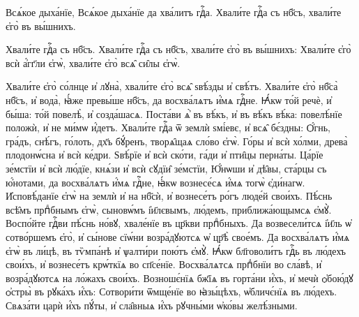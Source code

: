 %
 Всѧ́кое дыха́нїе,  
%
Всѧ́кое дыха́нїе да хва́литъ гдⷭ҇а. \hKv Хвали́те гдⷭ҇а съ нб҃съ,  хвали́те є҆го̀ въ вы́шнихъ. 
\label{vsakoe} 


\cuLettrine
Хвали́те гдⷭ҇а съ нб҃съ.  
%
 Хвали́те гдⷭ҇а съ нб҃съ, хвали́те  є҆го̀ въ вы́шнихъ:  
%
 Хвали́те є҆го̀ всѝ а҆́гг҃ли є҆гѡ̀,  хвали́те є҆го̀ всѧ̑ си̑лы є҆гѡ̀.  

\hKv Хвали́те є҆го̀ со́лнце и҆ лꙋна̀, хвали́те є҆го̀ всѧ̑  ѕвѣ́зды и҆ свѣ́тъ. 
\hKv Хвали́те є҆го̀ нб҃са̀ нб҃съ, и҆  вода̀, ꙗ҆́же превы́ше нб҃съ, да восхва́лѧтъ и҆́мѧ гдⷭ҇не.  
\hKv Ꙗ҆́кѡ то́й речѐ, и҆ бы́ша: то́й повелѣ̀, и҆  созда́шасѧ. 
\hKv Поста́ви  ѧ҆̀ въ  вѣ́къ, и҆ въ вѣ́къ вѣ́ка: повелѣ́нїе положѝ, и҆ не  ми́мѡ и҆́детъ. 
\hKv Хвали́те гдⷭ҇а ѿ землѝ ѕмі́евє, и҆  всѧ̑ бє́здны: 
\hKv Ѻ҆́гнь, гра́дъ, снѣ́гъ, го́лоть, дх҃ъ  бꙋ́ренъ, творѧ̑щаѧ сло́во є҆гѡ̀. 
\hKv Го́ры и҆ всѝ хо́лми,  древа̀ плодонѡ́сна и҆ всѝ ке́дри. 
\hKv Ѕвѣ́рїе и҆ всѝ  ско́ти, га́ди и҆ пти̑цы перна́ты. 
\hKv Ца́рїе зе́мстїи и҆  всѝ лю́дїе, кнѧ́зи и҆ всѝ сꙋдїи̑ зе́мстїи, 
\hKv Ю҆́нѡши и҆  дѣ̑вы, ста́рцы съ ю҆́нотами, да восхва́лѧтъ и҆́мѧ гдⷭ҇не,  ꙗ҆́кѡ вознесе́сѧ и҆́мѧ тогѡ̀ є҆ди́нагѡ. 
\hKv  И҆сповѣ́данїе є҆гѡ̀ на землѝ и҆ на нб҃сѝ, и҆ вознесе́тъ  ро́гъ люде́й свои́хъ. 
\hKv Пѣ́снь всѣ̑мъ прпⷣбнымъ  є҆гѡ̀, сыновѡ́мъ і҆и҃лєвымъ, лю́демъ, приближа́ющымсѧ  є҆мꙋ̀. 
\hKv Воспо́йте гдⷭ҇ви пѣ́снь но́вꙋ, хвале́нїе въ  цр҃кви прпⷣбныхъ. 
\hKv Да возвесели́тсѧ і҆и҃ль ѡ҆  сотво́ршемъ є҆го̀, и҆ сы́нове сїѡ́ни возра́дꙋютсѧ ѡ҆ цр҃ѣ̀  свое́мъ. 
\hKv Да восхва́лѧтъ и҆́мѧ є҆гѡ̀ въ ли́цѣ, въ  тѷмпа́нѣ и҆ ѱалти́ри пою́тъ є҆мꙋ̀. 
\hKv Ꙗ҆́кѡ  бл҃говоли́тъ гдⷭ҇ь въ лю́дехъ   свои́хъ, и҆ вознесе́тъ крѡ́ткїѧ во сп҃се́нїе. 
\hKv  Восхва́лѧтсѧ прпⷣбнїи во сла́вѣ, и҆ возра́дꙋютсѧ на  ло́жахъ свои́хъ. 
\hKv Возношє́нїѧ бж҃їѧ въ горта́ни и҆́хъ,  и҆ мечѝ ѻ҆бою́дꙋ ѻ҆стры̀ въ рꙋка́хъ и҆́хъ: 
\hKv  Сотвори́ти ѿмще́нїе во ꙗ҆зы́цѣхъ, ѡ҆бличє́нїѧ въ  лю́дехъ. 
\hKv Свѧза́ти царѝ и҆́хъ пꙋ́ты, и҆ сла̑вныѧ и҆́хъ  рꙋчны́ми ѡ҆ко́вы желѣ́зными. 

